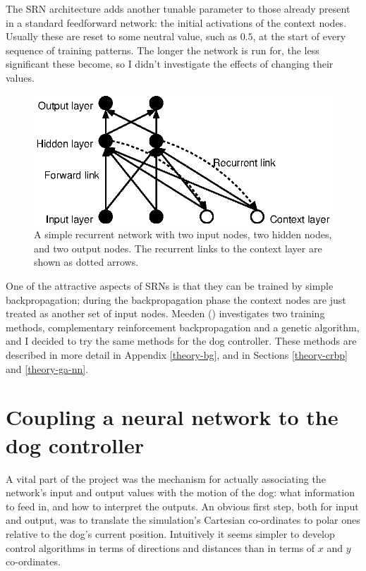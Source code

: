 \documentclass[a4paper]{report}
\begin{document}
The SRN architecture adds another tunable parameter to those already
present in a standard feedforward network: the initial activations of
the context nodes. Usually these are reset to some neutral value, such
as $0.5$, at the start of every sequence of training patterns. The
longer the network is run for, the less significant these become, so I
didn't investigate the effects of changing their values.

\begin{figure}[htb]
  \centerline{\includegraphics{figs/srn.eps}}
  \caption{  \label{fig-srn} A simple recurrent network with two 
    input nodes, two hidden nodes, and two output nodes. The recurrent
    links to the context layer are shown as dotted arrows.}
\end{figure}

One of the attractive aspects of SRNs is that they can be trained by
simple backpropagation; during the backpropagation phase the context
nodes are just treated as another set of input nodes.  Meeden
(\cite{meeden96}) investigates two training methods, complementary
reinforcement backpropagation and a genetic algorithm, and I decided
to try the same methods for the dog controller. These methods are
described in more detail in Appendix \ref{theory-bg}, and in Sections
\ref{theory-crbp} and \ref{theory-ga-nn}.

\section{Coupling a neural network to the dog controller}

\label{impl-coupling}
A vital part of the project was the mechanism for actually associating
the network's input and output values with the motion of the dog: what
information to feed in, and how to interpret the outputs. An obvious
first step, both for input and output, was to translate the
simulation's Cartesian co-ordinates to polar ones relative to the
dog's current position. Intuitively it seems simpler to develop
control algorithms in terms of directions and distances than in terms
of $x$ and $y$ co-ordinates.
\end{document}
